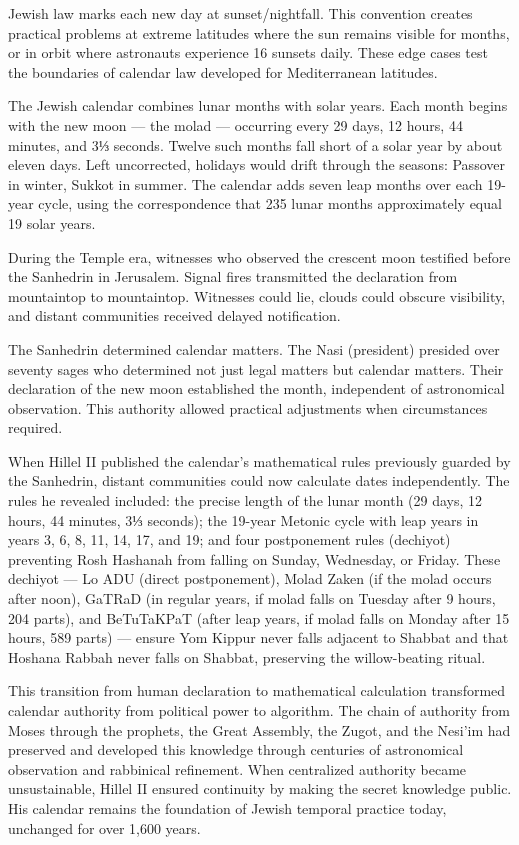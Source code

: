 Jewish law marks each new day at sunset/nightfall. This convention creates practical problems at extreme latitudes where the sun remains visible for months, or in orbit where astronauts experience 16 sunsets daily. These edge cases test the boundaries of calendar law developed for Mediterranean latitudes.

The Jewish calendar combines lunar months with solar years. Each month begins with the new moon — the molad — occurring every 29 days, 12 hours, 44 minutes, and 3⅓ seconds. Twelve such months fall short of a solar year by about eleven days. Left uncorrected, holidays would drift through the seasons: Passover in winter, Sukkot in summer. The calendar adds seven leap months over each 19-year cycle, using the correspondence that 235 lunar months approximately equal 19 solar years.

During the Temple era, witnesses who observed the crescent moon testified before the Sanhedrin in Jerusalem. Signal fires transmitted the declaration from mountaintop to mountaintop. Witnesses could lie, clouds could obscure visibility, and distant communities received delayed notification.

The Sanhedrin determined calendar matters. The Nasi (president) presided over seventy sages who determined not just legal matters but calendar matters. Their declaration of the new moon established the month, independent of astronomical observation. This authority allowed practical adjustments when circumstances required.

When Hillel II published the calendar's mathematical rules previously guarded by the Sanhedrin, distant communities could now calculate dates independently. The rules he revealed included: the precise length of the lunar month (29 days, 12 hours, 44 minutes, 3⅓ seconds); the 19-year Metonic cycle with leap years in years 3, 6, 8, 11, 14, 17, and 19; and four postponement rules (dechiyot) preventing Rosh Hashanah from falling on Sunday, Wednesday, or Friday. These dechiyot — Lo ADU (direct postponement), Molad Zaken (if the molad occurs after noon), GaTRaD (in regular years, if molad falls on Tuesday after 9 hours, 204 parts), and BeTuTaKPaT (after leap years, if molad falls on Monday after 15 hours, 589 parts) — ensure Yom Kippur never falls adjacent to Shabbat and that Hoshana Rabbah never falls on Shabbat, preserving the willow-beating ritual.

This transition from human declaration to mathematical calculation transformed calendar authority from political power to algorithm. The chain of authority from Moses through the prophets, the Great Assembly, the Zugot, and the Nesi'im had preserved and developed this knowledge through centuries of astronomical observation and rabbinical refinement. When centralized authority became unsustainable, Hillel II ensured continuity by making the secret knowledge public. His calendar remains the foundation of Jewish temporal practice today, unchanged for over 1,600 years.

